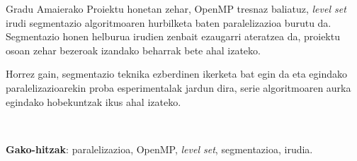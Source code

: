 
\thispagestyle{empty}


Gradu Amaierako Proiektu honetan zehar, OpenMP tresnaz baliatuz, \textit{level set} irudi segmentazio algoritmoaren hurbilketa baten paralelizazioa burutu da. Segmentazio honen helburua irudien zenbait ezaugarri ateratzea da, proiektu osoan zehar bezeroak izandako beharrak bete ahal izateko. 

Horrez gain, segmentazio teknika ezberdinen ikerketa bat egin da eta egindako paralelizazioarekin proba esperimentalak jardun dira, serie algoritmoaren aurka egindako hobekuntzak ikus ahal izateko. 

\

\textbf{Gako-hitzak}: paralelizazioa, OpenMP, \textit{level set}, segmentazioa, irudia.

\clearpage                         %
\thispagestyle{empty} \ \clearpage %
